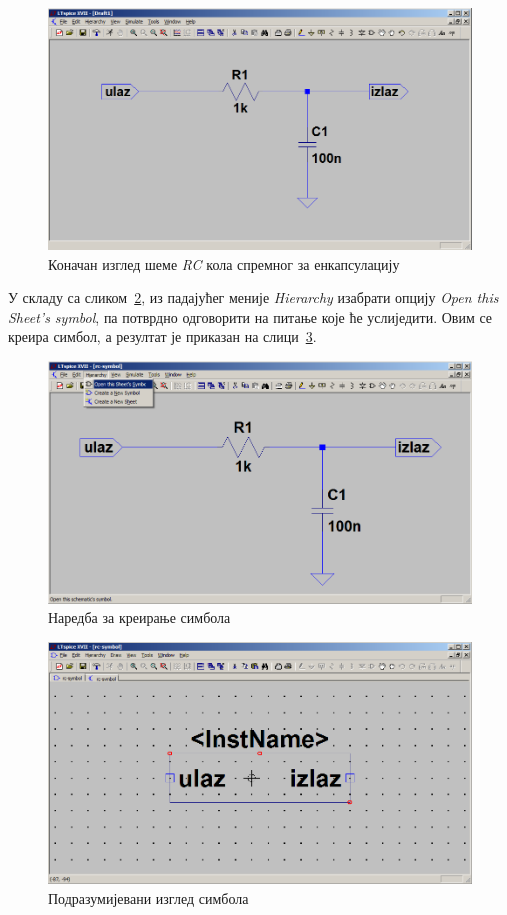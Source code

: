 \begin{figure}[h]
\centering
\includegraphics[width=\figwidth\textwidth]{figs/rc-symbol2.PNG}
\caption{Коначан изглед шеме \textit{RC} кола спремног за енкапсулацију}
\label{Fig:rc-symbol2}
\end{figure}

У складу са сликом~\ref{Fig:rc-symbol3}, из падајућег меније \textit{Hierarchy} изабрати опцију \textit{Open this Sheet's symbol}, па потврдно одговорити на питање које ће услиједити. Овим се креира симбол, а резултат је приказан на слици~\ref{Fig:rc-symbol5}.

\begin{figure}[h]
\centering
\includegraphics[width=\figwidth\textwidth]{figs/rc-symbol3.PNG}
\caption{Наредба за креирање симбола}
\label{Fig:rc-symbol3}
\end{figure}

\begin{figure}[h]
\centering
\includegraphics[width=\figwidth\textwidth]{figs/rc-symbol5.PNG}
\caption{Подразумијевани изглед симбола}
\label{Fig:rc-symbol5}
\end{figure}


